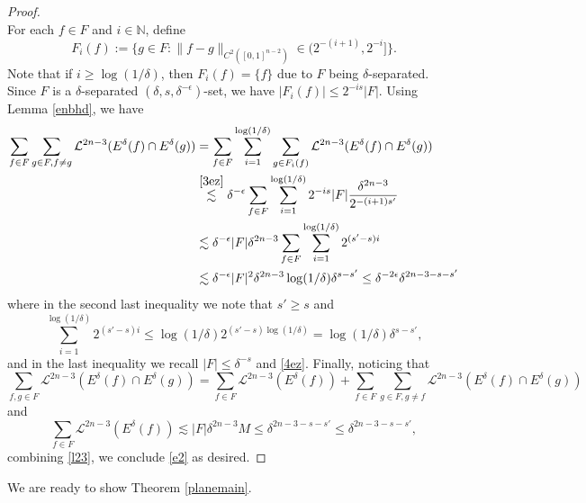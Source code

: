 \documentclass[11pt,a4paper,reqno]{amsart}
\newcommand{\1}{\mathbf{1}}
\numberwithin{equation}{section}
\theoremstyle{plain}
\theoremstyle{definition}
\theoremstyle{remark}
\begin{document}
\begin{proof}
\begin{equation}
  \end{equation}
  For each $f \in F$ and $i \in  \mathbb{N}$, define
   $$  F_i(f):= \{ g \in F : \|f-g\|_{C^2([0,1]^{n-2})}  \in (2^{-(i+1)},2^{-i}]  \} . $$
   Note that if $i \ge \log (1/\delta)$, then $F_i(f) =\{f\}$ due to $F$ being $\delta$-separated.
   Since $F$ is a $\delta$-separated $(\delta,s,\delta^{-\epsilon})$-set, we have $|F_i(f)| \le 2^{-is}|F|$.
   Using Lemma \ref{enbhd}, we have
   \begin{align}\label{l23}
    \sum_{f \in F}\sum_{g \in F, f\ne g}  \mathcal{L}^{2n-3}( E^\delta(f)\cap  E^\delta(g)) &= \sum_{f \in F}\sum_{i =1}^{\log (1/\delta)}\sum_{g \in F_i(f)}  \mathcal{L}^{2n-3}( E^\delta(f)\cap  E^\delta(g)) \notag\\
    &\overset{\eqref{3ez}}{\lesssim} \delta^{-\epsilon} \sum_{f \in F}\sum_{i=1}^{\log (1/\delta)}2^{-is}|F| \frac{\delta^{2n-3}}{2^{-(i+1)s'}} \notag \\
    & \lesssim  \delta^{-\epsilon}|F|\delta^{2n-3}\sum_{f \in F} \sum_{i=1}^{\log (1/\delta)} 2^{(s'-s)i} \notag\\
    & \lesssim \delta^{-\epsilon}|F|^2 \delta^{2n-3} \log (1/\delta)\delta^{s-s'}
     \le  \delta^{-2\epsilon}\delta^{2n-3-s-s'}
   \end{align}
   where in the second last inequality we note that $s'\ge s$ and $$\sum_{i=1}^{\log (1/\delta)} 2^{(s'-s)i} \le \log (1/\delta) 2^{(s'-s)\log (1/\delta) } = \log (1/\delta) \delta^{s-s'},$$
   and in the last inequality we recall $|F| \le \delta^{-s}$ and \eqref{4ez}.
   Finally, noticing that
   $$  \sum_{f ,g\in F}\mathcal{L}^{2n-3}( E^\delta(f)\cap  E^\delta(g)) = \sum_{f \in F} \mathcal{L}^{2n-3}( E^\delta(f))  + \sum_{f \in F}\sum_{g \in F, g \ne f}  \mathcal{L}^{2n-3}(E^\delta(f)\cap  E^\delta(g))  $$
   and
   $$  \sum_{f \in F} \mathcal{L}^{2n-3}( E^\delta(f)) \lesssim|F|  \delta^{2n-3} M \le \delta^{2n-3-s-s'} \le  \delta^{2n-3-s-s'},  $$
   combining \eqref{l23}, we conclude \eqref{e2} as desired.
\end{proof}


We are ready to show Theorem \ref{planemain}.
\end{document}
